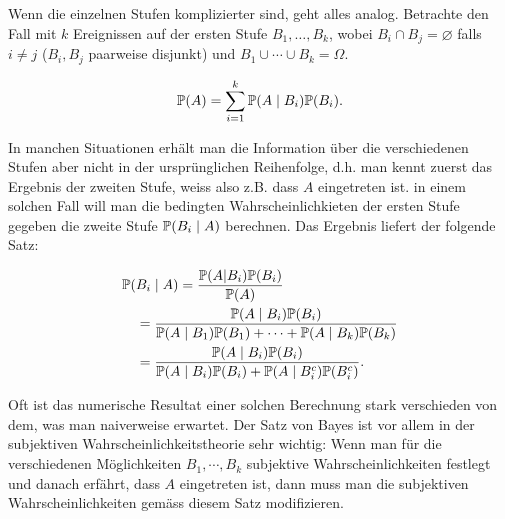 Wenn die einzelnen Stufen komplizierter sind, geht alles analog. Betrachte den Fall mit $k$ Ereignissen auf der ersten Stufe $B_1,\ldots,B_k$, wobei $B_i\cap B_j=\varnothing$ falls $i\neq j$ ($B_i,B_j$ paarweise disjunkt) und $B_1\cup \cdots \cup B_k=\Omega$.
\begin{satz}
	\begin{gather*}
		\mathbb P(A)=\sum_{i=1}^{k}\mathbb P(A\mid B_i)\mathbb P(B_i).
	\end{gather*}
\end{satz}
In manchen Situationen erhält man die Information über die verschiedenen Stufen aber nicht in der ursprünglichen Reihenfolge, d.h. man kennt zuerst das Ergebnis der zweiten Stufe, weiss also z.B. dass $A$ eingetreten ist. in einem solchen Fall will man die bedingten Wahrscheinlichkieten der ersten Stufe gegeben die zweite Stufe $\mathbb P(B_i\mid A)$ berechnen. Das Ergebnis liefert der folgende Satz:
\begin{satz}
	\begin{align*}
		&\mathbb P(B_i\mid A)=\frac{\mathbb P(A|B_i)\mathbb P(B_i)}{\mathbb P(A)}\\
		&\quad=\frac{\mathbb P(A\mid B_i)\mathbb P(B_i)}{\mathbb P(A\mid B_1)\mathbb P(B_1)+ \cdots+ \mathbb P(A\mid B_k)\mathbb P(B_k)}\\
		&\quad=\frac{\mathbb P(A\mid B_i)\mathbb P(B_i)}{\mathbb P(A\mid B_i)\mathbb P(B_i)+\mathbb P(A\mid B_i^c) \mathbb P(B_i^c)}.
	\end{align*}
\end{satz}
Oft ist das numerische Resultat einer solchen Berechnung stark verschieden von dem, was man naiverweise erwartet. Der Satz von Bayes ist vor allem in der subjektiven Wahrscheinlichkeitstheorie sehr wichtig: Wenn man für die verschiedenen Möglichkeiten $B_1,\cdots,B_k$ subjektive Wahrscheinlichkeiten festlegt und danach erfährt, dass $A$ eingetreten ist, dann muss man die subjektiven Wahrscheinlichkeiten gemäss diesem Satz modifizieren.
